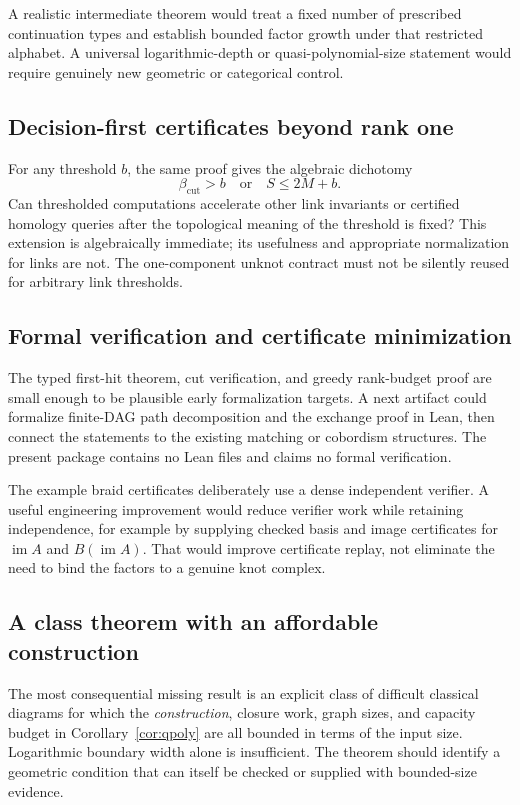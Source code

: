 \documentclass[11pt,letterpaper]{article}
\theoremstyle{definition}\newtheorem{definition}[theorem]{Definition}
\theoremstyle{remark}\newtheorem{remark}[theorem]{Remark}
\newcommand{\im}{\operatorname{im}}
\newcommand{\cutlb}{\beta_{\mathrm{cut}}}
\begin{document}
A realistic intermediate theorem would treat a fixed number of prescribed
continuation types and establish bounded factor growth under that restricted
alphabet. A universal logarithmic-depth or quasi-polynomial-size statement
would require genuinely new geometric or categorical control.

\subsection{Decision-first certificates beyond rank one}
For any threshold $b$, the same proof gives the algebraic dichotomy
\[
\cutlb>b\quad\text{or}\quad S\leq2M+b.
\]
Can thresholded computations accelerate other link invariants or certified
homology queries after the topological meaning of the threshold is fixed?
This extension is algebraically immediate; its usefulness and appropriate
normalization for links are not. The one-component unknot contract must not
be silently reused for arbitrary link thresholds.

\subsection{Formal verification and certificate minimization}
The typed first-hit theorem, cut verification, and greedy rank-budget proof
are small enough to be plausible early formalization targets. A next artifact
could formalize finite-DAG path decomposition and the exchange proof in Lean,
then connect the statements to the existing matching or cobordism structures.
The present package contains no Lean files and claims no formal verification.

The example braid certificates deliberately use a dense independent verifier.
A useful engineering improvement would reduce verifier work while retaining
independence, for example by supplying checked basis and image certificates
for $\im A$ and $B(\im A)$. That would improve certificate replay, not
eliminate the need to bind the factors to a genuine knot complex.

\subsection{A class theorem with an affordable construction}
The most consequential missing result is an explicit class of difficult
classical diagrams for which the \emph{construction}, closure work, graph
sizes, and capacity budget in Corollary~\ref{cor:qpoly} are all bounded in
terms of the input size. Logarithmic boundary width alone is insufficient.
The theorem should identify a geometric condition that can itself be checked
or supplied with bounded-size evidence.
\end{document}
